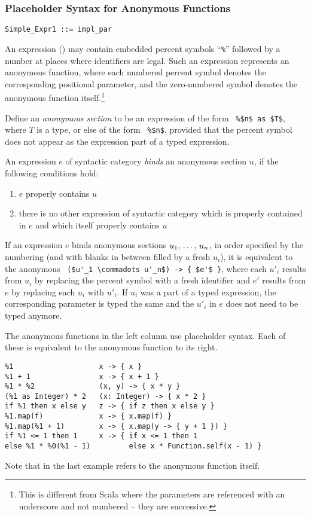 \subsubsection{Placeholder Syntax for Anonymous Functions}
\label{sec:placeholder-functions}

\syntax\begin{lstlisting}
Simple_Expr1 ::= impl_par
\end{lstlisting}

An expression () may contain embedded percent symbols ``\lstinline!%!'' followed by a number at places where identifiers are legal. Such an expression represents an anonymous function, where each numbered percent symbol denotes the corresponding positional parameter, and the zero-numbered symbol denotes the anonymous function itself.\footnote{This is different from Scala where the parameters are referenced with an underscore and not numbered -- they are successive.}

Define an {\em anonymous section} to be an expression of the form ~\lstinline!%$n$ as $T$!, where $T$ is a type, or else of the form ~\lstinline!%$n$!, provided that the percent symbol does not appear as the expression part of a typed expression. 

An expression $e$ of syntactic category  {\em binds} an anonymous section $u$, if the following conditions hold:
\begin{enumerate}
  \item $e$ properly contains $u$
  \item there is no other expression of syntactic category  which is properly contained in $e$ and which itself properly contains $u$
\end{enumerate}

If an expression $e$ binds anonymous sections $u_1 ,\, \ldots ,\, u_n$, in order specified by the numbering (and with blanks in between filled by a fresh $u_i$), it is equivalent to the anonymous ~\lstinline!($u'_1 \commadots u'_n$) -> { $e'$ }!, where each $u'_i$ results from $u_i$ by replacing the percent symbol with a fresh identifier and $e'$ results from $e$ by replacing each $u_i$ with $u'_i$. If $u_i$ was a part of a typed expression, the corresponding parameter is typed the same and the $u'_i$ in $e$ does not need to be typed anymore. 

\example The anonymous functions in the left column use placeholder syntax. Each of these is equivalent to the anonymous function to its right. 
\begin{lstlisting}
%1                    x -> { x }
%1 + 1                x -> { x + 1 }
%1 * %2               (x, y) -> { x * y }
(%1 as Integer) * 2   (x: Integer) -> { x * 2 }
if %1 then x else y   z -> { if z then x else y }
%1.map(f)             x -> { x.map(f) }
%1.map(%1 + 1)        x -> { x.map(y -> { y + 1 }) }
if %1 <= 1 then 1     x -> { if x <= 1 then 1 
else %1 * %0(%1 - 1)         else x * Function.self(x - 1) }     
\end{lstlisting}
Note that  in the last example refers to the anonymous function itself. 






